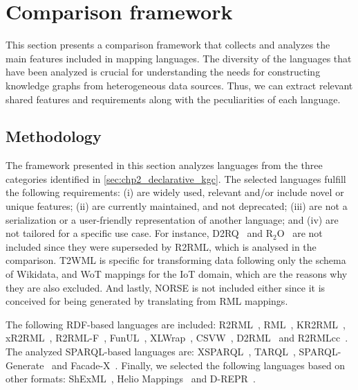 \section{Comparison framework}
\label{sec:chp4_framework}


This section presents a comparison framework that collects and analyzes the main features included in mapping languages. The diversity of the languages that have been analyzed is crucial for understanding the needs for constructing knowledge graphs from heterogeneous data sources. Thus, we can extract relevant shared features and requirements along with the peculiarities of each language. 


\subsection{Methodology}

The framework presented in this section analyzes languages from the three categories identified in \cref{sec:chp2_declarative_kgc}. 
The selected languages fulfill the following requirements: 
(i) are widely used, relevant and/or include novel or unique features; 
(ii) are currently maintained, and not deprecated; 
(iii) are not a serialization or a user-friendly representation of another language; and 
(iv) are not tailored for a specific use case. 
For instance, D2RQ~\parencite{bizer2004d2rq} and R$_2$O~\parencite{barrasa2004r2o} are not included since they were superseded by R2RML, which is analysed in the comparison. 
T2WML is specific for transforming data following only the schema of Wikidata, and WoT mappings for the IoT domain, which are the reasons why they are also excluded.
And lastly, NORSE is not included either since it is conceived for being generated by translating from RML mappings. 



The following RDF-based languages are included: R2RML~\parencite{das2012r2rml}, RML~\parencite{Dimou2014rml}, KR2RML~\parencite{slepicka2015kr2rml}, xR2RML~\parencite{michel2015xr2rml}, R2RML-F~\parencite{debruyne2016r2rmlf}, FunUL~\parencite{junior2016funul},  XLWrap~\parencite{langegger2009xlwrap}, CSVW~\parencite{Tennison2015csvw}, D2\-RML~\parencite{chortaras2018d2rml} and R2RMLcc~\parencite{debruyne2017R2RML-collections}. The analyzed SPARQL-based languages are: XSPARQL~\parencite{Bischof2012xsparql}, TARQL~\parencite{tarql},  SPARQL-Gene\-rate~\parencite{Lefrancois2017sparqlgenerate} and Facade-X~\parencite{daga2021facade}. Finally, we selected the following languages based on other formats: ShExML~\parencite{Garcia-Gonzalez2020shexml}, Helio Mappings~\parencite{cimmino2022helio} and D-REPR~\parencite{Vu2019d-repr}.  

